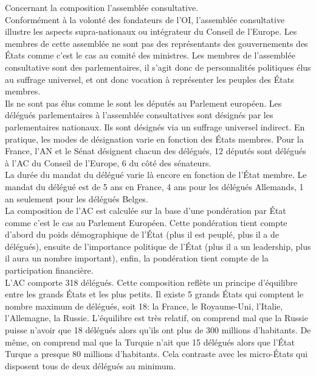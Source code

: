 \documentclass[10pt, a4paper, openany]{book}
\begin{document}
Concernant la composition l'assemblée consultative. \\
Conformément à la volonté des fondateurs de l'OI, l'assemblée consultative illustre les aspects supra-nationaux ou intégrateur du Conseil de l'Europe. Les membres de cette assemblée ne sont pas des représentants des gouvernements des États comme c'est le cas au comité des ministres. Les membres de l'assemblée consultative sont des parlementaires, il s'agit donc de personnalités politiques élus au suffrage universel, et ont donc vocation à représenter les peuples des États membres. \\
Ils ne sont pas élus comme le sont les députés au Parlement européen. Les délégués parlementaires à l'assemblée consultatives sont désignés par les parlementaires nationaux. Ils sont désignés via un suffrage universel indirect. En pratique, les modes de désignation varie en fonction des États membres. Pour la France, l'AN et le Sénat désignent chacun des délégués, 12 députés sont délégués à l'AC du Conseil de l'Europe, 6 du côté des sénateurs. \\
La durée du mandat du délégué varie là encore en fonction de l'État membre. Le mandat du délégué est de 5 ans en France, 4 ans pour les délégués Allemands, 1 an seulement pour les délégués Belges. \\
La composition de l'AC est calculée sur la base d'une pondération par État comme c'est le cas au Parlement Européen. Cette pondération tient compte d'abord du poids démographique de l'État (plus il est peuplé, plus il a de délégués), ensuite de l'importance politique de l'État (plus il a un leadership, plus il aura un nombre important), enfin, la pondération tient compte de la participation financière. \\
L'AC comporte 318 délégués. Cette composition reflète un principe d'équilibre entre les grands États et les plus petits. Il existe 5 grands États qui comptent le nombre maximum de délégués, soit 18: la France, le Royaume-Uni, l'Italie, l'Allemagne, la Russie. L'équilibre est très relatif, on comprend mal que la Russie puisse n'avoir que 18 délégués alors qu'ils ont plus de 300 millions d'habitants. De même, on comprend mal que la Turquie n'ait que 15 délégués alors que l'État Turque a presque 80 millions d'habitants. Cela contraste avec les micro-États qui disposent tous de deux délégués au minimum. 
\end{document}
